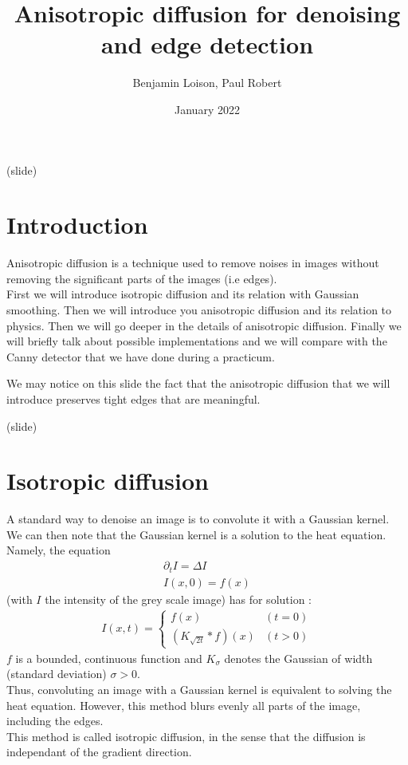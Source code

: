 \documentclass{article}
\title{Anisotropic diffusion for denoising and edge detection}
\author{Benjamin Loison, Paul Robert}
\date{January 2022}
\begin{document}
\maketitle

\setlength{\parindent}{0cm}

(slide)

\section{Introduction}
Anisotropic diffusion is a technique used to remove noises in images without removing the significant parts of the images (i.e edges).\\ %

First we will introduce isotropic diffusion and its relation with Gaussian smoothing. Then we will introduce you anisotropic diffusion and its relation to physics. Then we will go deeper in the details of anisotropic diffusion. Finally we will briefly talk about possible implementations and we will compare with the Canny detector that we have done during a practicum.

We may notice on this slide the fact that the anisotropic diffusion that we will introduce preserves tight edges that are meaningful.

(slide)

\section{Isotropic diffusion}

A standard way to denoise an image is to convolute it with a Gaussian kernel. We can then note that the Gaussian kernel is a solution to the heat equation. Namely, the equation 
\begin{equation}
\begin{align*}
    \partial_t I = \Delta I \\
    I(x,0)=f(x)
\end{align*}
\end{equation}
 (with $I$ the intensity of the grey scale image) has for solution : 
 \begin{equation}
 \begin{align*}
 I(x,t) = 
     \begin{cases}
     f(x) & (t=0) \\
     (K_{\sqrt{2t}} * f) (x) & (t>0)
     \end{cases}
 \end{align*}
 \end{equation}
$f$ is a bounded, continuous function and $K_\sigma$ denotes the Gaussian of width (standard deviation) $\sigma > 0$.\\ 
Thus, convoluting an image with a Gaussian kernel is equivalent to solving the heat equation. However, this method blurs evenly all parts of the image, including the edges.\\
This method is called isotropic diffusion, in the sense that the diffusion is independant of the gradient direction.
\end{document}
